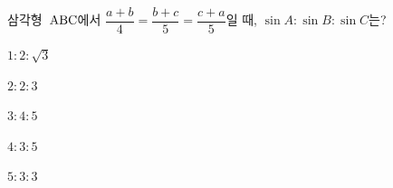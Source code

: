 삼각형~$\mathrm{ABC}$에서 $\dfrac{a+b}{4}=\dfrac{b+c}{5}=\dfrac{c+a}{5}$일 때, $\sin A:\sin B:\sin C$는?
\begin{choices32}{\rule[-3ex]{0pt}{8ex}$1:2:\sqrt{3}$}{\rule[-3ex]{0pt}{8ex}$2:2:3$}{\rule[-3ex]{0pt}{8ex}$3:4:5$}{\rule[-3ex]{0pt}{8ex}$4:3:5$}{\rule[-3ex]{0pt}{8ex}$5:3:3$}\end{choices32}
